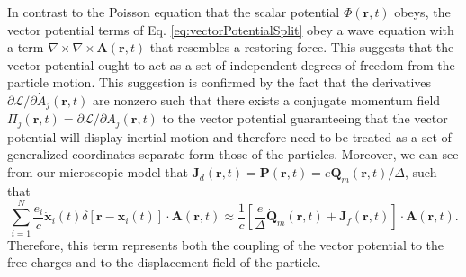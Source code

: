 \documentclass{article}
\begin{document}
In contrast to the Poisson equation that the scalar potential $\Phi(\mathbf{r},t)$ obeys, the vector potential terms of Eq. \eqref{eq:vectorPotentialSplit} obey a wave equation with a term $\nabla\times\nabla\times\mathbf{A}(\mathbf{r},t)$ that resembles a restoring force. This suggests that the vector potential ought to act as a set of independent degrees of freedom from the particle motion. This suggestion is confirmed by the fact that the derivatives $\partial\mathcal{L}/\partial \dot{A}_j(\mathbf{r},t)$ are nonzero such that there exists a conjugate momentum field $\Pi_j(\mathbf{r},t) = \partial\mathcal{L}/\partial \dot{A}_j(\mathbf{r},t)$ to the vector potential guaranteeing that the vector potential will display inertial motion and therefore need to be treated as a set of generalized coordinates separate form those of the particles. Moreover, we can see from our microscopic model that $\mathbf{J}_d(\mathbf{r},t) = \dot{\mathbf{P}}(\mathbf{r},t) = e\dot{\mathbf{Q}}_m(\mathbf{r},t)/\Delta$, such that 
\begin{equation}
\sum_{i = 1}^N\frac{e_i}{c}\dot{\mathbf{x}}_i(t)\delta[\mathbf{r} - \mathbf{x}_i(t)]\cdot\mathbf{A}(\mathbf{r},t) \approx \frac{1}{c}\left[\frac{e}{\Delta}\dot{\mathbf{Q}}_m(\mathbf{r},t) + \mathbf{J}_f(\mathbf{r},t)\right]\cdot\mathbf{A}(\mathbf{r},t).
\end{equation}
Therefore, this term represents both the coupling of the vector potential to the free charges and to the displacement field of the particle.
\end{document}

